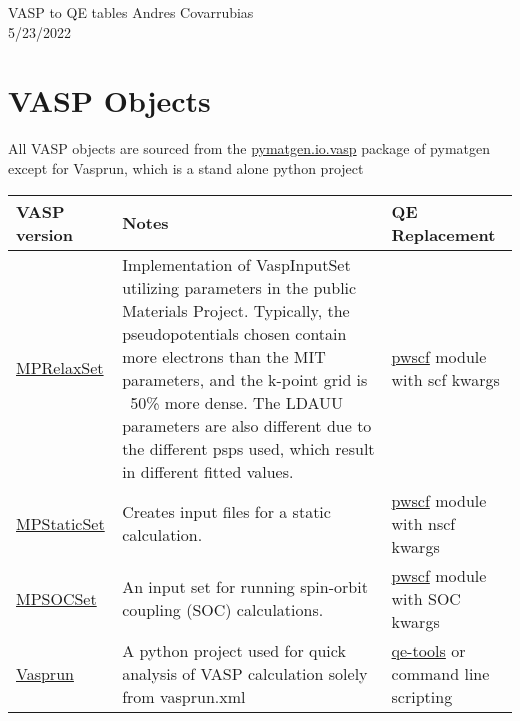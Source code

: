 \documentclass[12pt]{article}
\begin{document}
\noindent VASP to QE tables \hfill Andres Covarrubias    \\
5/23/2022

\hrulefill
\section*{VASP Objects}
All VASP objects are sourced from the \href{https://pymatgen.org/pymatgen.io.vasp.html?highlight=io\%20vasp\#module-pymatgen.io.vasp}{pymatgen.io.vasp} package of pymatgen except for Vasprun, which is a stand alone python project
\begin{center}
\begin{table}[ht]
\begin{tabularx}{\linewidth}{|>{\RaggedRight}p{2.5cm}|x|x|}\hline
 VASP version & Notes & QE Replacement \\ \hline
 
 \href{https://pymatgen.org/pymatgen.io.vasp.sets.html?highlight=mprelaxset#pymatgen.io.vasp.sets.MPRelaxSet}{MPRelaxSet} & 
 Implementation of VaspInputSet utilizing parameters in the public Materials Project. Typically, the pseudopotentials chosen contain more electrons than the MIT parameters, and the k-point grid is ~50\% more dense. The LDAUU parameters are also different due to the different psps used, which result in different fitted values. & 
\href{https://pymatgen.org/pymatgen.io.pwscf.html?highlight=pwscf}{pwscf} module with scf kwargs\\ \hline
 
 \href{https://pymatgen.org/pymatgen.io.vasp.sets.html?highlight=mpstaticset#pymatgen.io.vasp.sets.MPStaticSet}{MPStaticSet} &
Creates input files for a static calculation. &
\href{https://pymatgen.org/pymatgen.io.pwscf.html?highlight=pwscf}{pwscf} module with nscf kwargs \\ \hline
 
 \href{https://pymatgen.org/pymatgen.io.vasp.sets.html?highlight=mpsocset#pymatgen.io.vasp.sets.MPSOCSet}{MPSOCSet} &
 An input set for running spin-orbit coupling (SOC) calculations. &
\href{https://pymatgen.org/pymatgen.io.pwscf.html?highlight=pwscf}{pwscf} module with SOC kwargs \\ \hline
 
 \href{https://vasprun-xml.readthedocs.io/en/latest/}{Vasprun} &
 A python project used for quick analysis of VASP calculation solely from vasprun.xml &
 \href{https://github.com/maxhutch/qe-tools/blob/master/README.md}{qe-tools} or command line scripting\\ \hline
\end{tabularx}
\end{table}
\end{center}
\end{document}
